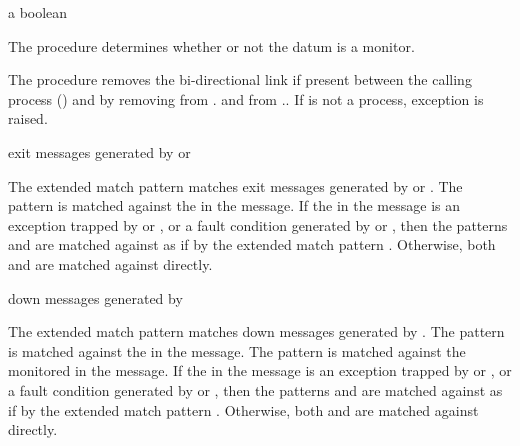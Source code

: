 \begin{procedure}
\end{procedure}
\returns{} a boolean

The  procedure determines whether or not the datum
 is a monitor.

\begin{procedure}
\end{procedure}
\returns{} 

The  procedure removes the bi-directional link if
present between the calling process () and  by
removing  from . and
 from ..  If  is not
a process, exception  is
raised.

\begin{match-extension}
\end{match-extension}
\matches{} exit messages generated by  or 

The extended match pattern 
matches exit messages generated by  or .
The pattern  is matched against the  in the message.
If the  in the message is
an exception trapped by  or , or
a fault condition generated by  or ,
then the patterns  and  are matched against
 as if by the extended match pattern
.
Otherwise, both  and  are matched against  directly.

\begin{match-extension}
\end{match-extension}
\matches{} down messages generated by 

The extended match pattern 
matches down messages generated by .
The pattern  is matched against the  in the message.
The pattern  is matched against the monitored  in the message.
If the  in the message is
an exception trapped by  or , or
a fault condition generated by  or ,
then the patterns  and  are matched against
 as if by the extended match pattern
.
Otherwise, both  and  are matched against  directly.

